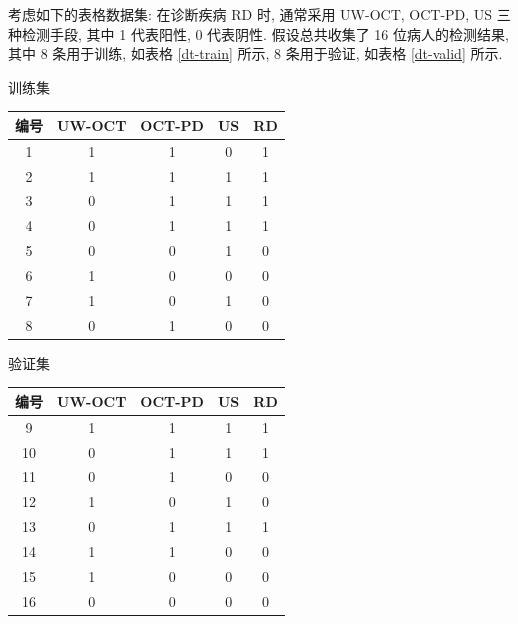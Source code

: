\documentclass[a4paper]{article}
\numberwithin{equation}{section}
\theoremstyle{definition}
\begin{document}
考虑如下的表格数据集: 在诊断疾病 RD 时, 通常采用 UW-OCT, OCT-PD, US 三种检测手段, 其中 1 代表阳性, 0 代表阴性. 假设总共收集了 16 位病人的检测结果, 其中 8 条用于训练, 如表格 \ref{dt-train} 所示, 8 条用于验证, 如表格 \ref{dt-valid} 所示.

\begin{minipage}{\textwidth}
    \begin{minipage}[t]{0.48\textwidth}
        \makeatletter{}
        \caption{训练集}
        \label{dt-train}
        \begin{tabular}{cccc|c}
            \hline
            编号 & UW-OCT & OCT-PD & US & RD \\
            \hline
            1  & 1      & 1      & 0  & 1  \\
            2  & 1      & 1      & 1  & 1  \\
            3  & 0      & 1      & 1  & 1  \\
            4  & 0      & 1      & 1  & 1  \\
            5  & 0      & 0      & 1  & 0  \\
            6  & 1      & 0      & 0  & 0  \\
            7  & 1      & 0      & 1  & 0  \\
            8  & 0      & 1      & 0  & 0  \\
            \hline
        \end{tabular}
    \end{minipage}
    \begin{minipage}[t]{0.48\textwidth}
        \makeatletter{}
        \caption{验证集}
        \label{dt-valid}
        \begin{tabular}{cccc|c}
            \hline
            编号 & UW-OCT & OCT-PD & US & RD \\
            \hline
            9  & 1      & 1      & 1  & 1  \\
            10 & 0      & 1      & 1  & 1  \\
            11 & 0      & 1      & 0  & 0  \\
            12 & 1      & 0      & 1  & 0  \\
            13 & 0      & 1      & 1  & 1  \\
            14 & 1      & 1      & 0  & 0  \\
            15 & 1      & 0      & 0  & 0  \\
            16 & 0      & 0      & 0  & 0  \\
            \hline
        \end{tabular}
    \end{minipage}
\end{minipage}
\end{document}
